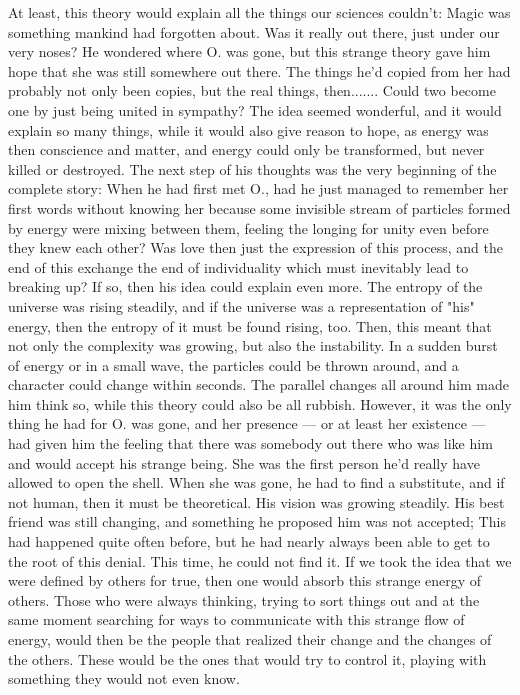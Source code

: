 At least, this theory would explain all the things our sciences couldn't: Magic was something mankind had forgotten about. Was it really out there, just under our very noses? 
He wondered where O. was gone, but this strange theory gave him hope that she was still somewhere out there. The things he'd copied from her had probably not only been copies, but the real things, then....... 
Could two become one by just being united in sympathy? The idea seemed wonderful, and it would explain so many things, while it would also give reason to hope, as energy was then conscience and matter, and energy could only be transformed, but never killed or destroyed. 
The next step of his thoughts was the very beginning of the complete story: When he had first met O., had he just managed to remember her first words without knowing her because some invisible stream of particles formed by energy were mixing between them, feeling the longing for unity even before they knew each other? Was love then just the expression of this process, and the end of this exchange the end of individuality which must inevitably lead to breaking up? If so, then his idea could explain even more. 
The entropy of the universe was rising steadily, and if the universe was a representation of "his" energy, then the entropy of it must be found rising, too. Then, this meant that not only the complexity was growing, but also the instability. In a sudden burst of energy or in a small wave, the particles could be thrown around, and a character could change within seconds. The parallel changes all around him made him think so, while this theory could also be all rubbish. However, it was the only thing he had for O. was gone, and her presence --- or at least her existence --- had given him the feeling that there was somebody out there who was like him and would accept his strange being. She was the first person he'd really have allowed to open the shell. When she was gone, he had to find a substitute, and if not human, then it must be theoretical. 
His vision was growing steadily. His best friend was still changing, and something he proposed him was not accepted; This had happened quite often before, but he had nearly always been able to get to the root of this denial. This time, he could not find it. 
If we took the idea that we were defined by others for true, then one would absorb this strange energy of others. Those who were always thinking, trying to sort things out and at the same moment searching for ways to communicate with this strange flow of energy, would then be the people that realized their change and the changes of the others. These would be the ones that would try to control it, playing with something they would not even know. 
